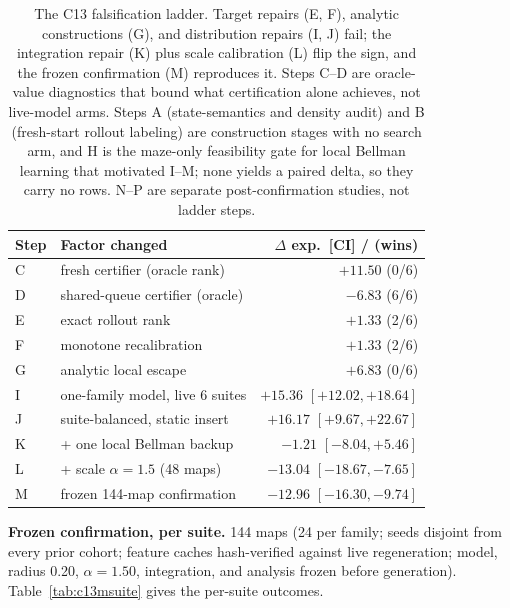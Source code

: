 \documentclass[letterpaper]{article} %
\newcommand{\stage}[1]{\textsc{#1}}
\begin{document}
\begin{table}[t]
\centering
\small
\setlength{\tabcolsep}{1.5pt}
\begin{tabular}{@{}llr@{}}
\toprule
Step & Factor changed & $\Delta$ exp.\ [CI] / (wins) \\
\midrule
C & fresh certifier (oracle rank) & $+11.50$ (0/6) \\
D & shared-queue certifier (oracle) & $-6.83$ (6/6) \\
E & exact rollout rank & $+1.33$ (2/6) \\
F & monotone recalibration & $+1.33$ (2/6) \\
G & analytic local escape & $+6.83$ (0/6) \\
I & one-family model, live 6 suites & $+15.36$ $[+12.02,+18.64]$ \\
J & suite-balanced, static insert & $+16.17$ $[+9.67,+22.67]$ \\
K & + one local Bellman backup & $-1.21$ $[-8.04,+5.46]$ \\
L & + scale $\alpha{=}1.5$ (48 maps) & $-13.04$ $[-18.67,-7.65]$ \\
M & frozen 144-map confirmation & $-12.96$ $[-16.30,-9.74]$ \\
\bottomrule
\end{tabular}
\caption{The \stage{C13} falsification ladder. Target repairs (E, F), analytic constructions (G), and distribution repairs (I, J) fail; the integration repair (K) plus scale calibration (L) flip the sign, and the frozen confirmation (M) reproduces it. Steps C--D are oracle-value diagnostics that bound what certification alone achieves, not live-model arms. Steps \stage{A} (state-semantics and density audit) and \stage{B} (fresh-start rollout labeling) are construction stages with no search arm, and \stage{H} is the maze-only feasibility gate for local Bellman learning that motivated \stage{I}--\stage{M}; none yields a paired delta, so they carry no rows. \stage{N}--\stage{P} are separate post-confirmation studies, not ladder steps.}
\label{tab:c13ladder}
\end{table}

\textbf{Frozen confirmation, per suite.} 144 maps (24 per family; seeds disjoint from every prior cohort; feature caches hash-verified against live regeneration; model, radius 0.20, $\alpha{=}1.50$, integration, and analysis frozen before generation). Table~\ref{tab:c13msuite} gives the per-suite outcomes.
\end{document}
